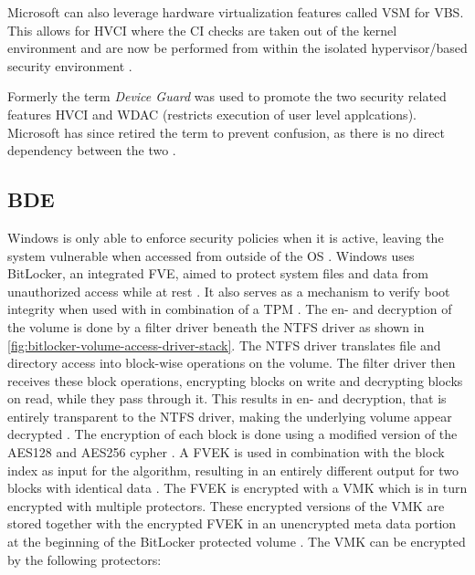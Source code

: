 Microsoft can also leverage hardware virtualization features called \ac{VSM} for \ac{VBS}.
This allows for \ac{HVCI} where the \ac{CI} checks are taken out of the kernel environment and are now be performed from within the isolated hypervisor\-/based security environment \cite{micosoft-windows-oem-vbs}.

Formerly the term \emph{Device Guard} was used to promote the two security related features \ac{HVCI} and \ac{WDAC} (restricts execution of user level applcations).
Microsoft has since retired the term to prevent confusion, as there is no direct dependency between the two \cite{microsoft-windows-no-longer-device-guard}.

\subsection{\acf{BDE}}
\label{sec:windows:security:bde}

Windows is only able to enforce security policies when it is active, leaving the system vulnerable when accessed from outside of the \ac{OS} \cite[Section 9]{windows-internals-6-part2}.
Windows uses BitLocker, an integrated \ac{FVE}, aimed to protect system files and data from unauthorized access while at rest \cite{microsoft-bitlocker-overview}.
It also serves as a mechanism to verify boot integrity when used with in combination of a \ac{TPM} \cite[Section 9]{windows-internals-6-part2}.
The en- and decryption of the volume is done by a filter driver beneath the \ac{NTFS} driver as shown in \autoref{fig:bitlocker-volume-access-driver-stack}.
The \ac{NTFS} driver translates file and directory access into block-wise operations on the volume.
The filter driver then receives these block operations, encrypting blocks on write and decrypting blocks on read, while they pass through it.
This results in en- and decryption, that is entirely transparent to the \ac{NTFS} driver, making the underlying volume appear decrypted \cite[Section 9]{windows-internals-6-part2}.
The encryption of each block is done using a modified version of the \ac{AES}128 and \ac{AES}256 cypher \cite[Section 9]{windows-internals-6-part2}.
A \ac{FVEK} is used in combination with the block index as input for the algorithm, resulting in an entirely different output for two blocks with identical data \cite[Section 9]{windows-internals-6-part2}.
The \ac{FVEK} is encrypted with a \ac{VMK} which is in turn encrypted with multiple protectors.
These encrypted versions of the \ac{VMK} are stored together with the encrypted \ac{FVEK} in an unencrypted meta data portion at the beginning of the BitLocker protected volume \cite[Section 9]{windows-internals-6-part2}.
The \ac{VMK} can be encrypted by the following protectors:

